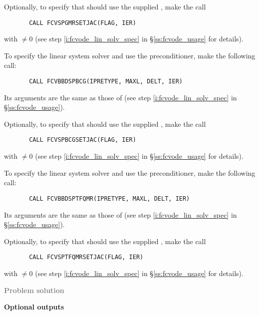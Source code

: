 \begin{Steps}
  Optionally, to specify that {\spgmr} should use the supplied , 
  make the call
\begin{verbatim}
       CALL FCVSPGMRSETJAC(FLAG, IER)
\end{verbatim}
  with  $\neq 0$ 
  (see step \ref{i:fcvode_lin_solv_spec} in \S\ref{ss:fcvode_usage} for details).
  

  To specify the {\spbcg} linear system solver and use the {\cvbbdpre}
  preconditioner, make the following call:
\begin{verbatim}
       CALL FCVBBDSPBCG(IPRETYPE, MAXL, DELT, IER)
\end{verbatim}
  Its arguments are the same as those of 
  (see step \ref{i:fcvode_lin_solv_spec} in \S\ref{ss:fcvode_usage}).
  
  Optionally, to specify that {\spbcg} should use the supplied , 
  make the call
\begin{verbatim}
       CALL FCVSPBCGSETJAC(FLAG, IER)
\end{verbatim}
  with  $\neq 0$ 
  (see step \ref{i:fcvode_lin_solv_spec} in \S\ref{ss:fcvode_usage} for details).


  To specify the {\sptfqmr} linear system solver and use the {\cvbbdpre}
  preconditioner, make the following call:
\begin{verbatim}
       CALL FCVBBDSPTFQMR(IPRETYPE, MAXL, DELT, IER)
\end{verbatim}
  Its arguments are the same as those of 
  (see step \ref{i:fcvode_lin_solv_spec} in \S\ref{ss:fcvode_usage}).
  
  Optionally, to specify that {\sptfqmr} should use the supplied , 
  make the call
\begin{verbatim}
       CALL FCVSPTFQMRSETJAC(FLAG, IER)
\end{verbatim}
  with  $\neq 0$ 
  (see step \ref{i:fcvode_lin_solv_spec} in \S\ref{ss:fcvode_usage} for details).

\item \textcolor{gray}{\bf Problem solution}
  
\item {\bf {\cvbbdpre} Optional outputs}
  

\end{Steps}
